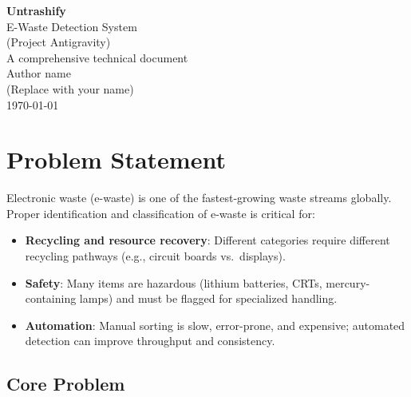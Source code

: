 \documentclass[11pt,a4paper]{article}
\begin{document}
\begin{titlepage}
    \centering
    \vspace*{1.5cm}
    {\LARGE\bfseries Untrashify}\\[0.5cm]
    {\LARGE E-Waste Detection System}\\[0.3cm]
    {\large (Project Antigravity)}\\[1.5cm]
    {\large A comprehensive technical document}\\[2cm]
    \vfill
    {\large Author name}\\[0.3cm]
    {\footnotesize (Replace with your name)}\\[0.5cm]
    \vfill
    {\small \today}
\end{titlepage}

\tableofcontents
\newpage

\section{Problem Statement}
\label{sec:problem}

Electronic waste (e-waste) is one of the fastest-growing waste streams globally. Proper identification and classification of e-waste is critical for:

\begin{itemize}[noitemsep]
    \item \textbf{Recycling and resource recovery}: Different categories require different recycling pathways (e.g., circuit boards vs.\ displays).
    \item \textbf{Safety}: Many items are hazardous (lithium batteries, CRTs, mercury-containing lamps) and must be flagged for specialized handling.
    \item \textbf{Automation}: Manual sorting is slow, error-prone, and expensive; automated detection can improve throughput and consistency.
\end{itemize}

\subsection{Core Problem}
\end{document}
